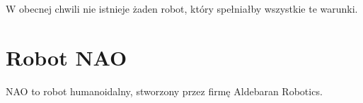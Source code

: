 W obecnej chwili nie istnieje żaden robot, który spełniałby wszystkie te warunki.


\section{Robot NAO}

NAO to robot humanoidalny, stworzony przez firmę Aldebaran Robotics. 
